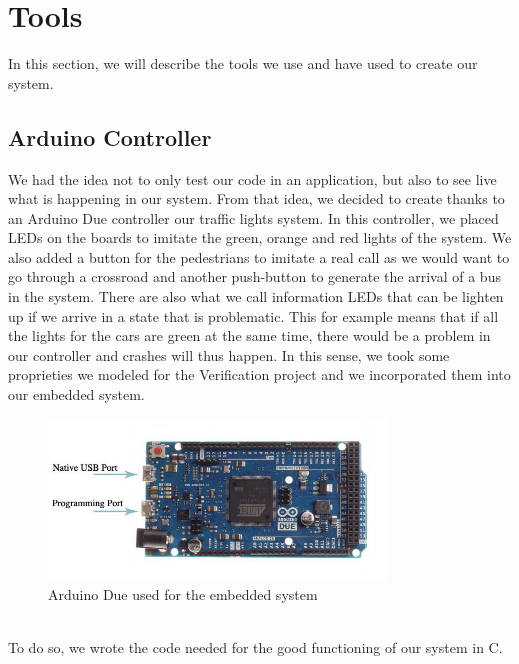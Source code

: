 \section{Tools}
In this section, we will describe the tools we use and have used to create our system.

\subsection{Arduino Controller}
We had the idea not to only test our code in an application, but also to see live what is happening in our system. From that idea, we decided to create thanks to an Arduino Due controller our traffic lights system. In this controller, we placed LEDs on the boards to imitate the green, orange and red lights of the system. We also added a button for the pedestrians to imitate a real call as we would want to go through a crossroad and another push-button to generate the arrival of a bus in the system. There are also what we call information LEDs that can be lighten up if we arrive in a state that is problematic. This for example means that if all the lights for the cars are green at the same time, there would be a problem in our controller and crashes will thus happen. In this sense, we took some proprieties we modeled for the Verification project and we incorporated them into our embedded system.
\begin{figure}[!ht]\label{fig:arduino}
  \centering
    \includegraphics[width=0.8\textwidth]{picture/arduino.jpg}
    \caption{Arduino Due used for the embedded system}
\end{figure} \\
To do so, we wrote the code needed for the good functioning of our system in C.

